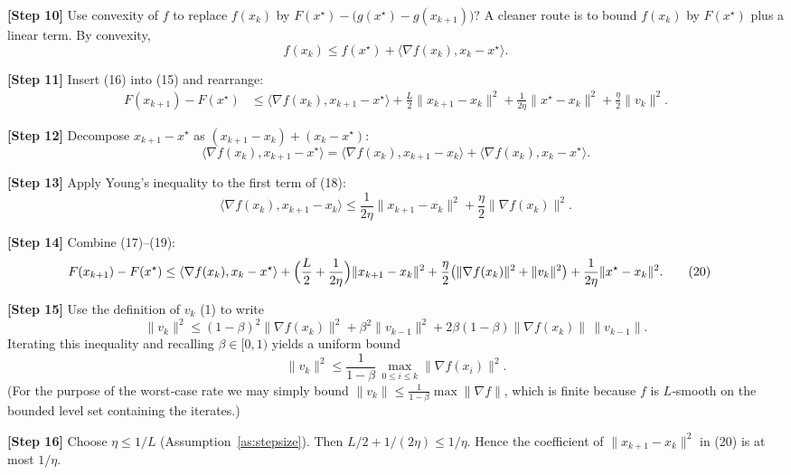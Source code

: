 \documentclass{article}
\begin{document}
\noindent\textbf{[Step 10]}  Use convexity of $f$ to replace $f(x_{k})$ by $F(x^{\star})-\bigl(g(x^{\star})-g(x_{k+1})\bigr)$?  
A cleaner route is to bound $f(x_{k})$ by $F(x^{\star})$ plus a linear term. By convexity,
\[
f(x_{k}) \le f(x^{\star})+\langle\nabla f(x_{k}),x_{k}-x^{\star}\rangle. \tag{16}
\]

\noindent\textbf{[Step 11]}  Insert (16) into (15) and rearrange:
\[
\begin{aligned}
F(x_{k+1})-F(x^{\star})
&\le \langle\nabla f(x_{k}),x_{k+1}-x^{\star}\rangle
+\frac{L}{2}\|x_{k+1}-x_{k}\|^{2}
+\frac{1}{2\eta}\|x^{\star}-x_{k}\|^{2}
+\frac{\eta}{2}\|v_{k}\|^{2}. \tag{17}
\end{aligned}
\]

\noindent\textbf{[Step 12]}  Decompose $x_{k+1}-x^{\star}$ as $(x_{k+1}-x_{k})+(x_{k}-x^{\star})$:
\[
\langle\nabla f(x_{k}),x_{k+1}-x^{\star}\rangle
=\langle\nabla f(x_{k}),x_{k+1}-x_{k}\rangle
+\langle\nabla f(x_{k}),x_{k}-x^{\star}\rangle. \tag{18}
\]

\noindent\textbf{[Step 13]}  Apply Young’s inequality to the first term of (18):
\[
\langle\nabla f(x_{k}),x_{k+1}-x_{k}\rangle
\le \frac{1}{2\eta}\|x_{k+1}-x_{k}\|^{2}
+\frac{\eta}{2}\|\nabla f(x_{k})\|^{2}. \tag{19}
\]

\noindent\textbf{[Step 14]}  Combine (17)–(19):
\[
\begin{aligned}
F(x_{k+1})-F(x^{\star})
&\le \langle\nabla f(x_{k}),x_{k}-x^{\star}\rangle
+\Bigl(\frac{L}{2}+\frac{1}{2\eta}\Bigr)\|x_{k+1}-x_{k}\|^{2}
+\frac{\eta}{2}\bigl(\|\nabla f(x_{k})\|^{2}+\|v_{k}\|^{2}\bigr)
+\frac{1}{2\eta}\|x^{\star}-x_{k}\|^{2}. \tag{20}
\end{aligned}
\]

\noindent\textbf{[Step 15]}  Use the definition of $v_{k}$ (1) to write
\[
\|v_{k}\|^{2}\le (1-\beta)^{2}\|\nabla f(x_{k})\|^{2}
+ \beta^{2}\|v_{k-1}\|^{2}+2\beta(1-\beta)\|\nabla f(x_{k})\|\,\|v_{k-1}\|.
\]
Iterating this inequality and recalling $\beta\in[0,1)$ yields a uniform bound
\[
\|v_{k}\|^{2}\le \frac{1}{1-\beta}\,\max_{0\le i\le k}\|\nabla f(x_{i})\|^{2}. \tag{21}
\]
(For the purpose of the worst‑case rate we may simply bound $\|v_{k}\|\le \frac{1}{1-\beta}\max\|\nabla f\|$, which is finite because $f$ is $L$‑smooth on the bounded level set containing the iterates.)

\noindent\textbf{[Step 16]}  Choose $\eta\le 1/L$ (Assumption~\ref{as:stepsize}). Then $L/2+1/(2\eta)\le 1/\eta$. Hence the coefficient of $\|x_{k+1}-x_{k}\|^{2}$ in (20) is at most $1/\eta$.
\end{document}
